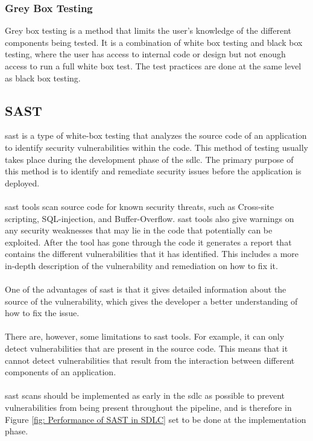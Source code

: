 \subsubsection{Grey Box Testing}
Grey box testing is a method that limits the user's knowledge of the different components being tested. It is a combination of white box testing and black box testing, where the user has access to internal code or design but not enough access to run a full white box test. The test practices are done at the same level as black box testing. \cite{GreyBox}


\subsection{SAST}
\acrlong{sast} is a type of white-box testing that analyzes the source code of an application to identify security vulnerabilities within the code. This method of testing usually takes place during the development phase of the \acrlong{sdlc}. The primary purpose of this method is to identify and remediate security issues before the application is deployed. \cite{sast}
\\~\\
\acrshort{sast} tools scan source code for known security threats, such as \gls{Cross-site scripting}, \gls{SQL-injection}, and \gls{Buffer-Overflow}. \acrshort{sast} tools also give warnings on any security weaknesses that may lie in the code that potentially can be exploited. After the tool has gone through the code it generates a report that contains the different vulnerabilities that it has identified. This includes a more in-depth description of the vulnerability and remediation on how to fix it. \
\\~\\
One of the advantages of \acrshort{sast} is that it gives detailed information about the source of the vulnerability, which gives the developer a better understanding of how to fix the issue. 
\\~\\
There are, however, some limitations to \acrshort{sast} tools. For example, it can only detect vulnerabilities that are present in the source code. This means that it cannot detect vulnerabilities that result from the interaction between different components of an application.
\\~\\
\acrshort{sast} scans should be implemented as early in the \acrshort{sdlc} as possible to prevent vulnerabilities from being present throughout the pipeline, and is therefore in Figure \ref{fig: Performance of SAST in SDLC} set to be done at the implementation phase.  

